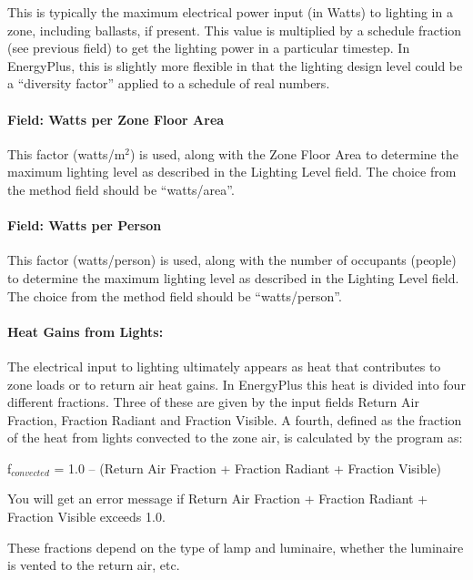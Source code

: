 This is typically the maximum electrical power input (in Watts) to lighting in a zone, including ballasts, if present. This value is multiplied by a schedule fraction (see previous field) to get the lighting power in a particular timestep. In EnergyPlus, this is slightly more flexible in that the lighting design level could be a ``diversity factor'' applied to a schedule of real numbers.

\paragraph{Field: Watts per Zone Floor Area}\label{field-watts-per-zone-floor-area}

This factor (watts/m\(^{2}\)) is used, along with the Zone Floor Area to determine the maximum lighting level as described in the Lighting Level field. The choice from the method field should be ``watts/area''.

\paragraph{Field: Watts per Person}\label{field-watts-per-person}

This factor (watts/person) is used, along with the number of occupants (people) to determine the maximum lighting level as described in the Lighting Level field. The choice from the method field should be ``watts/person''.

\paragraph{Heat Gains from Lights:}\label{heat-gains-from-lights}

The electrical input to lighting ultimately appears as heat that contributes to zone loads or to return air heat gains. In EnergyPlus this heat is divided into four different fractions. Three of these are given by the input fields Return Air Fraction, Fraction Radiant and Fraction Visible. A fourth, defined as the fraction of the heat from lights convected to the zone air, is calculated by the program as:

f\(_{convected}\) = 1.0 -- (Return Air Fraction + Fraction Radiant + Fraction Visible)

You will get an error message if Return Air Fraction + Fraction Radiant + Fraction Visible exceeds 1.0.

These fractions depend on the type of lamp and luminaire, whether the luminaire is vented to the return air, etc.

